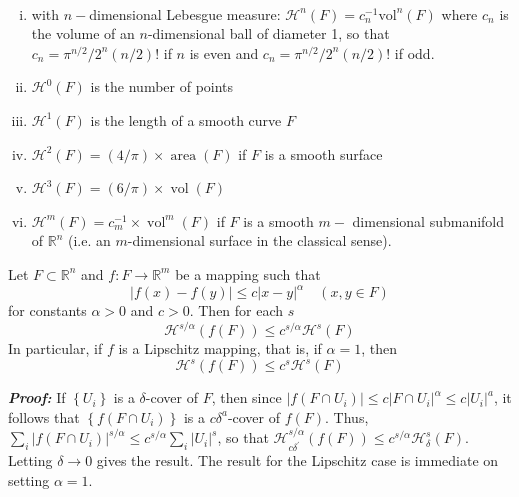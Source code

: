 \begin{property} $ $
    \begin{enumerate}[(i)]
        \item with $n-$dimensional Lebesgue measure: $\mathcal{H}^n(F) = c_n^{-1} \text{vol}^n(F)$ where $c_n$ is the volume of an $n$-dimensional ball of diameter 1, so that $c_{n}=\pi^{n / 2} / 2^{n}(n / 2) !$ if $n$ is even and $c_{n}=\pi^{n / 2} / 2^{n}(n / 2) !$ if odd.
        \item $\mathcal{H}^0(F)$ is the number of points
        \item $\mathcal{H}^1(F)$ is the length of a smooth curve $F$
        \item $\mathcal{H}^2(F) = (4/\pi) \times \operatorname{area}(F)$ if $F$ is a smooth surface
        \item $\mathcal{H}^{3}(F)=(6 / \pi) \times \operatorname{vol}(F)$
        \item $\mathcal{H}^{m}(F)=c_{m}^{-1} \times \operatorname{vol}^{m}(F)$ if $F$ is a smooth $m-$
        dimensional submanifold of $\mathbb{R}^{n}$ (i.e. an $m$-dimensional surface in the classical sense).
    \end{enumerate}
\end{property}

\begin{proposition}\label{Haus-holder}
    Let $F \subset \mathbb{R}^{n}$ and $f: F \rightarrow \mathbb{R}^{m}$ be a mapping such that
$$
|f(x)-f(y)| \leq c|x-y|^{\alpha} \quad(x, y \in F)
$$
for constants $\alpha>0$ and $c>0 .$ Then for each $s$
$$
\mathcal{H}^{s / \alpha}(f(F)) \leq c^{s / \alpha} \mathcal{H}^{s}(F)
$$
In particular, if $f$ is a Lipschitz mapping, that is, if $\alpha=1$, then
$$
\mathcal{H}^{s}(f(F)) \leq c^{s} \mathcal{H}^{s}(F)
$$
\end{proposition}

\textbf{\textit{Proof:}} If $\left\{U_{i}\right\}$ is a $\delta$-cover of $F$, 
then since $\left|f\left(F \cap U_{i}\right)\right| \leq c\left|F \cap U_{i}\right|^{\alpha} \leq c\left|U_{i}\right|^{a}$, 
it follows that $\left\{f\left(F \cap U_{i}\right)\right\}$ is a $c \delta^{a}$-cover of $f(F)$. 
Thus, $\displaystyle\sum_{i}\left|f\left(F \cap U_{i}\right)\right|^{s / \alpha} \leq c^{s / \alpha} \sum_{i}\left|U_{i}\right|^{s}$, so that $\mathcal{H}_{c \delta^{\prime}}^{s / \alpha}(f(F)) \leq c^{s / \alpha} \mathcal{H}_{\delta}^{s}(F)$. Letting
$\delta \rightarrow 0$ gives the result. 
The result for the Lipschitz case is immediate on setting $\alpha=1$.

